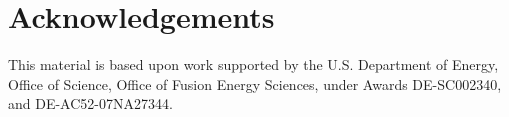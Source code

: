\section*{Acknowledgements}

This material is based upon work supported by the U.S. Department of Energy, Office of Science, Office of Fusion Energy Sciences,
under Awards 
DE-SC002340, %
and
DE-AC52-07NA27344.  %

